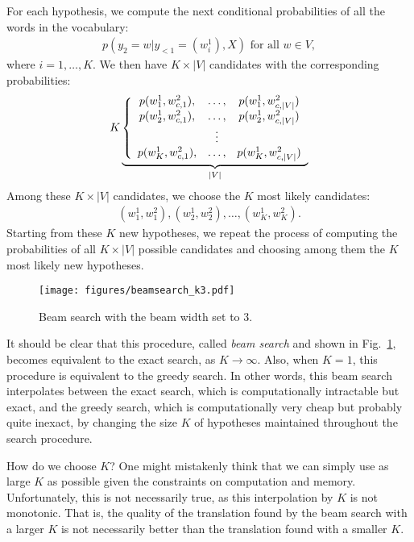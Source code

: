 \documentclass{report}
\begin{document}
For each hypothesis, we compute the next conditional probabilities of all the
words in the vocabulary:
\begin{align*}
    p(y_2=w|y_{<1}=(w_i^1), X)\text{ for all }w \in V,
\end{align*}
where $i=1, \ldots, K$. 
We then have $K \times |V|$ candidates with the corresponding probabilities:
\begin{align*}
    K \underbrace{\left\{
        \begin{array}{c c c}
                p(w_1^1, w_{c,1}^2),& \ldots,& p(w_1^1, w_{c,|V|}^2) \\
                p(w_2^1, w_{c,1}^2),& \ldots,& p(w_2^1, w_{c,|V|}^2) \\
                                   &\vdots& \\
            p(w_K^1, w_{c,1}^2),& \ldots,& p(w_K^1, w_{c,|V|}^2) \\
        \end{array}
    \right.}_{|V|}
\end{align*}
Among these $K \times |V|$ candidates, we choose the $K$ most likely candidates:
\begin{align*}
    (w_1^1, w_1^2), (w_2^1, w_2^2), \ldots, (w_K^1,w_K^2).
\end{align*}
Starting from these $K$ new hypotheses, we repeat the process of computing the
probabilities of all $K \times |V|$ possible candidates and choosing among them
the $K$ most likely new hypotheses. 

\begin{figure}[t]
    \centering
    \centering
    \texttt{[image: figures/beamsearch\_k3.pdf]}

    \caption{Beam search with the beam width set to $3$.}
    \label{fig:beamsearch}
\end{figure}

It should be clear that this procedure, called {\em beam search} and shown in
Fig.~\ref{fig:beamsearch}, becomes
equivalent to the exact search, as $K\to \infty$. Also, when $K=1$, this
procedure is equivalent to the greedy search. In other words, this beam search
interpolates between the exact search, which is computationally intractable but
exact, and the greedy search, which is computationally very cheap but probably
quite inexact, by changing the size $K$ of hypotheses maintained throughout the
search procedure. 

How do we choose $K$? One might mistakenly think that we can simply use as large
$K$ as possible given the constraints on computation and memory. Unfortunately,
this is not necessarily true, as this interpolation by $K$ is not monotonic.
That is, the quality of the translation found by the beam search with a larger
$K$ is not necessarily better than the translation found with a smaller $K$.
\end{document}
